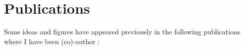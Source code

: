 

\chapter*{Publications} %



Some ideas and figures have appeared previously in the following publications
where I have been (co)-author :


